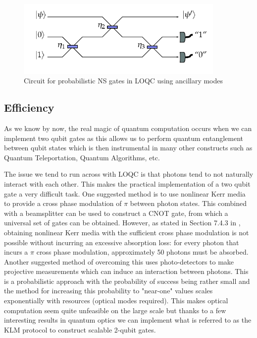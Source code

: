 \begin{figure}[h]
    \centering
    \includegraphics[width=0.9\textwidth]{images/NS gate.png}
    \caption{Circuit for probabilistic NS gates in LOQC using ancillary modes}\label{fig:NS_gate}
\end{figure}



\subsection{Efficiency}
As we know by now, the real magic of quantum computation occurs when we can implement two qubit gates as this allows us to perform quantum entanglement between qubit states which is then instrumental in many other constructs such as Quantum Teleportation, Quantum Algorithms, etc.

The issue we tend to run across with LOQC is that photons tend to not naturally interact with each other. This makes the practical implementation of a two qubit gate a very difficult task. One suggested method is to use nonlinear Kerr media to provide a cross phase modulation of $\pi$ between photon states. This combined with a beamsplitter can be used to construct a CNOT gate, from which a universal set of gates can be obtained. However, as stated in Section 7.4.3 in \cite{nielsen_chuang_2010}, obtaining nonlinear Kerr media with the sufficient cross phase modulation is not possible without incurring an excessive absorption loss: for every photon that incurs a $\pi$ cross phase modulation, approximately 50 photons must be absorbed. Another suggested method of overcoming this uses photo-detectors to make projective measurements which can induce an interaction between photons\cite{Kok:2005jip}. This is a probabilistic approach with the probability of success being rather small and the method for increasing this probability to "near-one" values scales exponentially with resources (optical modes required). This makes optical computation seem quite unfeasible on the large scale but thanks to a few interesting results in quantum optics we can implement what is referred to as the KLM protocol to construct scalable 2-qubit gates.


